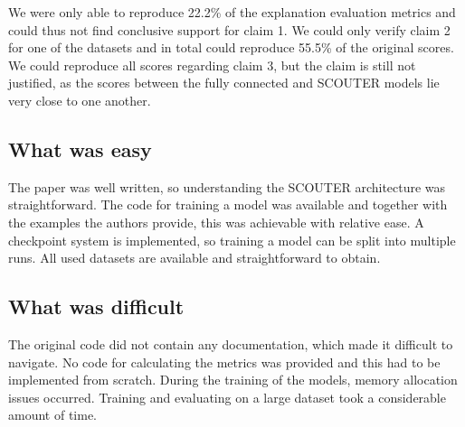 We were only able to reproduce 22.2\% of the explanation evaluation metrics and could thus not find conclusive support for claim 1. We could only verify claim 2 for one of the datasets and in total could reproduce 55.5\% of the original scores. We could reproduce all scores regarding claim 3, but the claim is still not justified, as the scores between the fully connected and SCOUTER models lie very close to one another.

\subsection*{What was easy}

The paper was well written, so understanding the SCOUTER architecture was straightforward. The code for training a model was available and together with the examples the authors provide, this was achievable with relative ease. A checkpoint system is implemented, so training a model can be split into multiple runs. All used datasets are available and straightforward to obtain.

\subsection*{What was difficult}

The original code did not contain any documentation, which made it difficult to navigate. No code for calculating the metrics was provided and this had to be implemented from scratch. During the training of the models, memory allocation issues occurred. Training and evaluating on a large dataset took a considerable amount of time.

